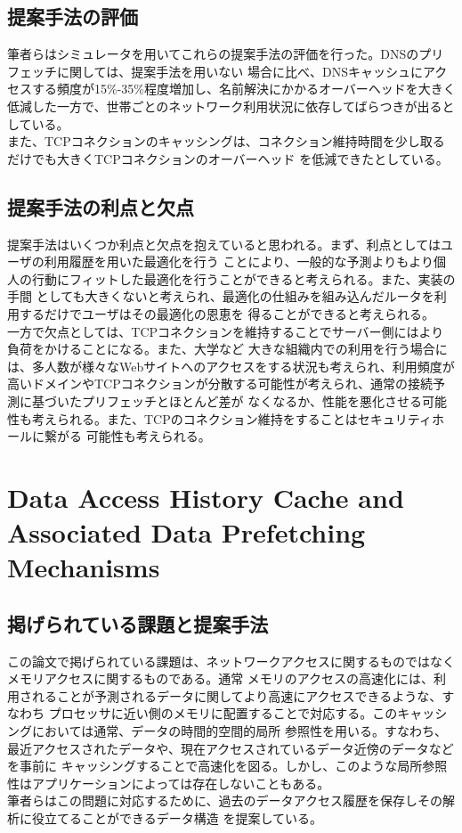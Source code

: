 \documentclass[10pt,a4paper]{ltjsarticle}       %
\begin{document}
\subsection{提案手法の評価}
筆者らはシミュレータを用いてこれらの提案手法の評価を行った。DNSのプリフェッチに関しては、提案手法を用いない
場合に比べ、DNSキャッシュにアクセスする頻度が15\%-35\%程度増加し、名前解決にかかるオーバーヘッドを大きく
低減した一方で、世帯ごとのネットワーク利用状況に依存してばらつきが出るとしている。\\

また、TCPコネクションのキャッシングは、コネクション維持時間を少し取るだけでも大きくTCPコネクションのオーバーヘッド
を低減できたとしている。
\subsection{提案手法の利点と欠点}
提案手法はいくつか利点と欠点を抱えていると思われる。まず、利点としてはユーザの利用履歴を用いた最適化を行う
ことにより、一般的な予測よりもより個人の行動にフィットした最適化を行うことができると考えられる。また、実装の手間
としても大きくないと考えられ、最適化の仕組みを組み込んだルータを利用するだけでユーザはその最適化の恩恵を
得ることができると考えられる。\\

一方で欠点としては、TCPコネクションを維持することでサーバー側にはより負荷をかけることになる。また、大学など
大きな組織内での利用を行う場合には、多人数が様々なWebサイトへのアクセスをする状況も考えられ、利用頻度が
高いドメインやTCPコネクションが分散する可能性が考えられ、通常の接続予測に基づいたプリフェッチとほとんど差が
なくなるか、性能を悪化させる可能性も考えられる。また、TCPのコネクション維持をすることはセキュリティホールに繋がる
可能性も考えられる。
\section{Data Access History Cache and Associated Data Prefetching Mechanisms}
\subsection{掲げられている課題と提案手法}
この論文で掲げられている課題は、ネットワークアクセスに関するものではなくメモリアクセスに関するものである。通常
メモリのアクセスの高速化には、利用されることが予測されるデータに関してより高速にアクセスできるような、すなわち
プロセッサに近い側のメモリに配置することで対応する。このキャッシングにおいては通常、データの時間的空間的局所
参照性を用いる。すなわち、最近アクセスされたデータや、現在アクセスされているデータ近傍のデータなどを事前に
キャッシングすることで高速化を図る。しかし、このような局所参照性はアプリケーションによっては存在しないこともある。\\
筆者らはこの問題に対応するために、過去のデータアクセス履歴を保存しその解析に役立てることができるデータ構造
を提案している。
\end{document}
